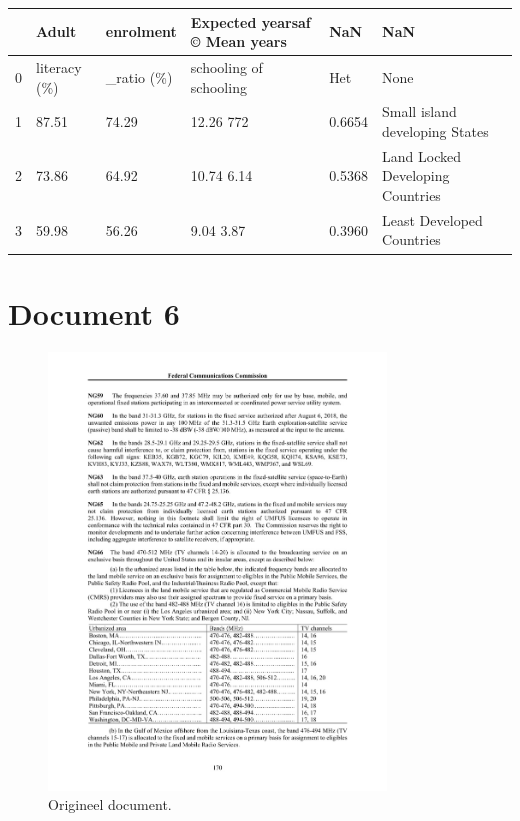 \begin{tabular}{llllll}
\toprule
{} &         Adult &   enrolment & Expected yearsaf © Mean years &     NaN &                               NaN \\
\midrule
0 &  literacy (\%) &  \_ratio (\%) &        schooling of schooling &     Het &                              None \\
1 &         87.51 &       74.29 &                     12.26 772 &  0.6654 &    Small island developing States \\
2 &         73.86 &       64.92 &                    10.74 6.14 &  0.5368 &  Land Locked Developing Countries \\
3 &         59.98 &       56.26 &                     9.04 3.87 &  0.3960 &         Least Developed Countries \\
\bottomrule
\end{tabular}
\section{Document 6}

\begin{figure}[H]
    \centering
    \includegraphics[width=0.8\textwidth]{test-resultaten/6/original.jpg}
    \caption{Origineel document.}
\end{figure}

